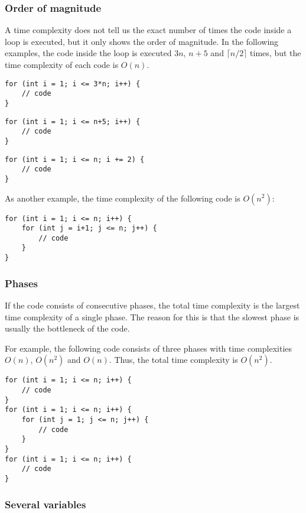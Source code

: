\subsubsection*{Order of magnitude}

A time complexity does not tell us the exact number
of times the code inside a loop is executed,
but it only shows the order of magnitude.
In the following examples, the code inside the loop
is executed $3n$, $n+5$ and $\lceil n/2 \rceil$ times,
but the time complexity of each code is $O(n)$.

\begin{lstlisting}
for (int i = 1; i <= 3*n; i++) {
    // code
}
\end{lstlisting}

\begin{lstlisting}
for (int i = 1; i <= n+5; i++) {
    // code
}
\end{lstlisting}

\begin{lstlisting}
for (int i = 1; i <= n; i += 2) {
    // code
}
\end{lstlisting}

As another example,
the time complexity of the following code is $O(n^2)$:

\begin{lstlisting}
for (int i = 1; i <= n; i++) {
    for (int j = i+1; j <= n; j++) {
        // code
    }
}
\end{lstlisting}

\subsubsection*{Phases}

If the code consists of consecutive phases,
the total time complexity is the largest
time complexity of a single phase.
The reason for this is that the slowest
phase is usually the bottleneck of the code.

For example, the following code consists
of three phases with time complexities
$O(n)$, $O(n^2)$ and $O(n)$.
Thus, the total time complexity is $O(n^2)$.

\begin{lstlisting}
for (int i = 1; i <= n; i++) {
    // code
}
for (int i = 1; i <= n; i++) {
    for (int j = 1; j <= n; j++) {
        // code
    }
}
for (int i = 1; i <= n; i++) {
    // code
}
\end{lstlisting}

\subsubsection*{Several variables}

